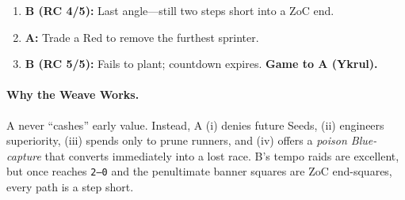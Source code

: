 \begin{multicols}{2}
\begin{enumerate}[leftmargin=*,itemsep=0.35em,label=\textbf{M\arabic*:}]
\item \textbf{B (RC 4/5):} Last angle—still two steps short into a ZoC end.

\item \textbf{A:} Trade a Red to remove the furthest sprinter.

\item \textbf{B (RC 5/5):} Fails to plant; countdown expires. \textbf{Game to A (Ykrul).}

\end{enumerate}
\end{multicols}

\paragraph{Why the Weave Works.}
A never “cashes” early value. Instead, A (i) denies future Seeds, (ii) engineers \CapC{} superiority, (iii) spends \SC{} only to prune runners, and (iv) offers a \emph{poison Blue-capture} that converts immediately into a lost \RC{} race. B’s tempo raids are excellent, but once \CapC{} reaches \texttt{2--0} and the penultimate banner squares are ZoC end-squares, every path is a step short.

